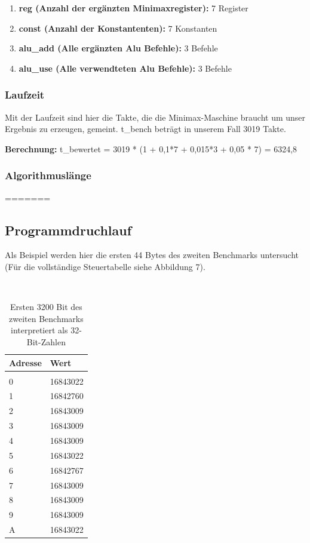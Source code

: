 \documentclass[12pt,titlepage]{article}
\begin{document}
\begin{enumerate}
\item \textbf{reg (Anzahl der ergänzten Minimaxregister): } 7 Register
\item \textbf{const (Anzahl der Konstantenten): } 7 Konstanten
\item \textbf{alu_add (Alle erg{\"a}nzten Alu Befehle): } 3 Befehle
\item \textbf{alu_use (Alle verwendteten Alu Befehle): } 3 Befehle
\end{enumerate}

\subsubsection{Laufzeit}
Mit der Laufzeit sind hier die Takte, die die Minimax-Maschine braucht um unser Ergebnis zu erzeugen, gemeint. t_{bench} beträgt in unserem Fall 3019 Takte.

\textbf{Berechnung:} t_{bewertet} = 3019 * (1 + 0,1*7 + 0,015*3 + 0,05 * 7) = 6324,8  

\subsubsection{Algorithmuslänge}



=======
\newpage

\subsection{Programmdruchlauf}
Als Beispiel werden hier die ersten 44 Bytes des zweiten Benchmarks untersucht (Für die vollständige Steuertabelle siehe Abbildung 7).

\leavevmode \\

\begin{table}[h!]
    \begin{tabular}{l|l}
    Adresse & Wert            \\
    \hline                    \\
    0     & 16843022  \\
    1     & 16842760  \\
    2     & 16843009  \\
    3     & 16843009  \\
    4     & 16843009  \\
    5     & 16843022  \\
    6     & 16842767  \\
    7     & 16843009  \\
    8     & 16843009  \\
    9     & 16843009  \\
    A     & 16843022  \\
    \end{tabular}
    \caption{Ersten 3200 Bit des zweiten Benchmarks interpretiert als 32-Bit-Zahlen}
\end{table}
\end{document}
